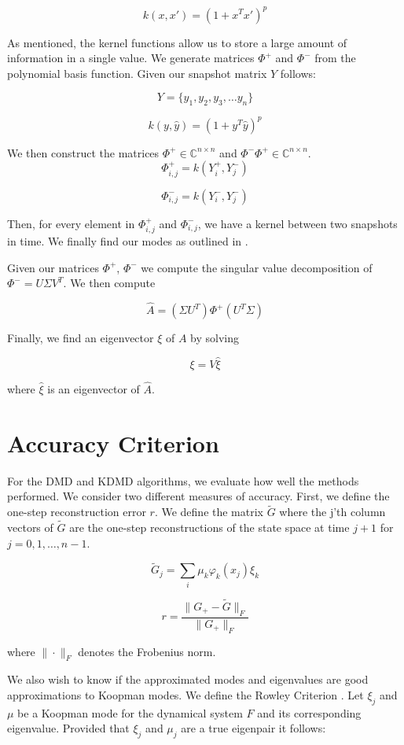 $$
k(x,x') = (1 + x^Tx')^p
$$

\vspace{3mm}

As mentioned, the kernel functions allow us to store a large amount of information in a single value. We generate matrices
$\Phi^+$ and $\Phi^-$ from the polynomial basis function. Given our snapshot matrix $Y$
follows:

$$
 Y = \{y_1,y_2,y_3, \dots y_n\}
$$

$$
k (y,{\hat y}) = (1 + y^T {\hat y})^p
$$

\noindent We then construct the matrices $\Phi^{+}\in \mathbb{C}^{n \times n}$ and $ \Phi^{-}\Phi^{+}\in \mathbb{C}^{n \times n}$.
$$
\Phi^{+}_{i,j} = k(Y^{+}_{i}, Y^{-}_j)
$$

$$
\Phi^{-}_{i,j} = k(Y^{-}_{i}, Y^{-}_j)
$$

\noindent Then, for every element in $\Phi^{+}_{i,j}$ and $\Phi^{-}_{i,j}$, we have a kernel between two snapshots in time. We finally find
our modes as outlined in \cite{williams2015kernelbased}.

Given our matrices $\Phi^{+}$, $\Phi^{-}$ we compute the singular value decomposition of $\Phi^{-} = U \Sigma V^T$. 
We then compute

$$
{\hat A} = (\Sigma U^T) \Phi^{+} (U^T \Sigma )
$$

\noindent Finally, we find an eigenvector $\xi$ of $A$ by solving

$$
\xi = V {\hat \xi}
$$

\noindent where ${\hat \xi}$ is an eigenvector of ${\hat A}$.

\section{Accuracy Criterion}
For the DMD and KDMD algorithms, we evaluate how
well the methods performed. We consider two different measures
of accuracy. First, we define the one-step reconstruction
error $r$. We define the matrix ${\tilde G}$ where the j'th column vectors of ${\tilde G}$ are the one-step
reconstructions of the state space at time $j+1$ for $j=0,1,\dots, n-1$.

$$
{\tilde G}_{j} = \sum_{i} \mu_k \varphi_k(x_j) \xi_k
$$

$$
r = \frac{\|G_{+} - {\tilde G} \|_F}{\|G_{+}\|_F}
$$

\noindent where $\| \cdot \|_F$ denotes the Frobenius norm.

We also wish to know if the approximated modes and eigenvalues are good approximations to 
Koopman modes. We define the Rowley Criterion \cite{zhang2017evaluating}. Let $\xi_j$ and $\mu$ be a Koopman mode for the
 dynamical system $F$ and its corresponding eigenvalue. Provided that $\xi_j$ and $\mu_j$ are
a true eigenpair it follows:

